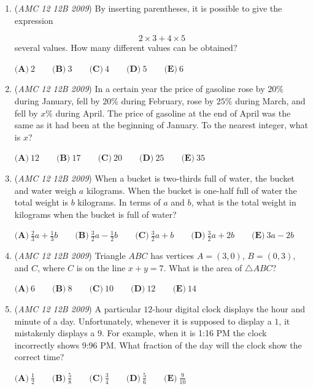\begin{enumerate}
 $\textbf{(A)}\ 10\qquad \textbf{(B)}\ 12\qquad \textbf{(C)}\ 16\qquad \textbf{(D)}\ 18\qquad \textbf{(E)}\ 24$


	\item (\textit{AMC 12 12B 2009}) By inserting parentheses, it is possible to give the expression

 \[2\times3 + 4\times5\]
several values. How many different values can be obtained?


 $\textbf{(A)}\ 2\qquad \textbf{(B)}\ 3\qquad \textbf{(C)}\ 4\qquad \textbf{(D)}\ 5\qquad \textbf{(E)}\ 6$


	\item (\textit{AMC 12 12B 2009}) In a certain year the price of gasoline rose by $20\%$ during January, fell by $20\%$ during February, rose by $25\%$ during March, and fell by $x\%$ during April. The price of gasoline at the end of April was the same as it had been at the beginning of January. To the nearest integer, what is $x$?


 $\textbf{(A)}\ 12\qquad \textbf{(B)}\ 17\qquad \textbf{(C)}\ 20\qquad \textbf{(D)}\ 25\qquad \textbf{(E)}\ 35$


	\item (\textit{AMC 12 12B 2009}) When a bucket is two-thirds full of water, the bucket and water weigh $a$ kilograms. When the bucket is one-half full of water the total weight is $b$ kilograms. In terms of $a$ and $b$, what is the total weight in kilograms when the bucket is full of water?


 $\textbf{(A)}\ \frac23a + \frac13b\qquad \textbf{(B)}\ \frac32a - \frac12b\qquad \textbf{(C)}\ \frac32a + b \qquad \textbf{(D)}\ \frac32a + 2b\qquad \textbf{(E)}\ 3a - 2b$


	\item (\textit{AMC 12 12B 2009}) Triangle $ABC$ has vertices $A = (3,0)$, $B = (0,3)$, and $C$, where $C$ is on the line $x + y = 7$. What is the area of $\triangle ABC$?


 $\textbf{(A)}\ 6\qquad \textbf{(B)}\ 8\qquad \textbf{(C)}\ 10\qquad \textbf{(D)}\ 12\qquad \textbf{(E)}\ 14$


	\item (\textit{AMC 12 12B 2009}) A particular $12$-hour digital clock displays the hour and minute of a day. Unfortunately, whenever it is supposed to display a $1$, it mistakenly displays a $9$. For example, when it is 1:16 PM the clock incorrectly shows 9:96 PM. What fraction of the day will the clock show the correct time?


 $\textbf{(A)}\ \frac12\qquad \textbf{(B)}\ \frac58\qquad \textbf{(C)}\ \frac34\qquad \textbf{(D)}\ \frac56\qquad \textbf{(E)}\ \frac {9}{10}$



\end{enumerate}
